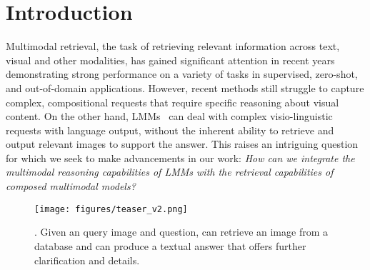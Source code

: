 \section{Introduction}
\label{sec:introduction}
%
Multimodal retrieval, the task of retrieving relevant information across text, visual and other modalities, has gained significant attention in recent years~\cite{radford2021clip,li2022blip,zhai2023sigmoid,chen2023pali, yu2022coca, wang2023image, zhou2022non, zhai2019large, yao2021filip, goel2022cyclip, gao2022pyramidclip, lee2022uniclip, ilharco2021openclip, schuhmann2021laion400m, gao2023softclip, bao2022vlmo, desai2023hyperbolic} demonstrating strong performance on a variety of tasks in supervised, zero-shot, and out-of-domain applications.
However, recent methods still struggle to capture complex, compositional requests that require specific reasoning about visual content.
On the other hand, LMMs~\cite{openai2024gpt4,geminiteam2024gemini,anthropic2024claude,zhu2024minigpt,liu2023llava,liu2023improvedllava,chen2024far,jiang2024mantis, wang2024qwen2, ye2024mplug, chen2024internvl, mckinzie2024mm1, wu2023next, dubey2024llama, agrawal2024pixtral} can deal with complex visio-linguistic requests with language output, without the inherent ability to retrieve and output relevant images to support the answer.
This raises an intriguing question for which we seek to make advancements in our work: \emph{How can we integrate the multimodal reasoning capabilities of LMMs with the retrieval capabilities of composed multimodal models?} 
%

\begin{figure}[t]
  \centering
   \texttt{[image: figures/teaser\_v2.png]}
   \vspace{-2mm}
   \caption{\underline{\tasknamebos}. Given an query image and question, \modelname can retrieve an image from a database and can produce a textual answer that offers further clarification and details.}
   \label{fig:main_figure}
   \vspace{-4mm}
\end{figure}



